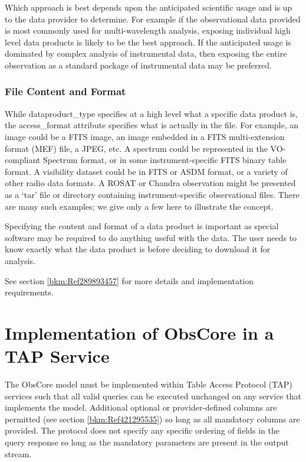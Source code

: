 \documentclass[11pt,a4paper]{ivoa}
\begin{document}
Which approach is best depends upon the anticipated scientific usage and is up to the data provider to determine.  For
example if the observational data provided is most commonly used for multi-wavelength analysis, exposing individual
high level data products is likely to be the best approach.  If the anticipated usage is dominated by complex analysis
of instrumental data, then exposing the entire observation as a standard package of instrumental data may be preferred.

\subsubsection{File Content and Format}
While dataproduct\_type specifies at a high level what a specific data product is, the access\_format attribute
specifies what is actually in the file.  For example, an {\textquotedbl}image{\textquotedbl} could be a FITS image, an
image embedded in a FITS multi-extension format (MEF) file, a JPEG, etc.  A {\textquotedbl}spectrum{\textquotedbl}
could be represented in the VO-compliant Spectrum format, or in some instrument-specific FITS binary table format.  A
visibility dataset could be in FITS or ASDM format, or a variety of other radio data formats.  A ROSAT or Chandra
observation might be presented as a `tar' file or directory containing instrument-specific observational files.  There
are many such examples; we give only a few here to illustrate the concept.

Specifying the content and format of a data product is important as special software may be required to do anything
useful with the data.  The user needs to know exactly what the data product is before deciding to download it for
analysis.

See section \ref{bkm:Ref289893457} for more details and implementation requirements.

\section{Implementation of ObsCore in a TAP Service}
\label{sec:obstap-impl}The ObsCore model must be implemented within Table Access Protocol (TAP) services such that all
valid queries can be executed unchanged on any service that implements the model.  Additional optional or
provider-defined columns are permitted (see section \ref{bkm:Ref421295535}) so long as all mandatory columns are
provided.  The protocol does not specify any specific ordering of fields in the query response so long as the mandatory
parameters are present in the output stream.
\end{document}
